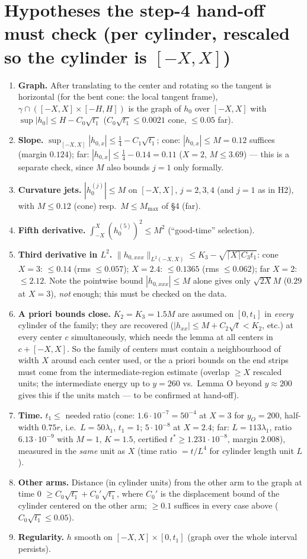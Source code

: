 \documentclass[11pt]{article}
\begin{document}
\section{Hypotheses the step-4 hand-off must check (per cylinder, rescaled so the cylinder is $[-X,X]$)}
\begin{enumerate}
\item[H1] \textbf{Graph.} After translating to the center and rotating so the tangent is horizontal (for the bent cone: the local tangent frame), $\gamma\cap([-X,X]\times[-H,H])$ is the graph of $h_0$ over $[-X,X]$ with $\sup|h_0|\le H-C_0\sqrt{t_1}$ ($C_0\sqrt{t_1}\le0.0021$ cone, $\le0.05$ far).
\item[H2] \textbf{Slope.} $\sup_{[-X,X]}|h_{0,x}|\le\frac14-C_1\sqrt{t_1}$; cone: $|h_{0,x}|\le M=0.12$ suffices (margin $0.124$); far: $|h_{0,x}|\le\frac14-0.14=0.11$ ($X=2$, $M\le3.69$) --- this is a separate check, since $M$ also bounds $j=1$ only formally.
\item[H3] \textbf{Curvature jets.} $|h_0^{(j)}|\le M$ on $[-X,X]$, $j=2,3,4$ (and $j=1$ as in H2), with $M\le0.12$ (cone) resp.\ $M\le M_{\max}$ of \S4 (far).
\item[H4] \textbf{Fifth derivative.} $\int_{-X}^X(h_0^{(5)})^2\le M^2$ (``good-time'' selection).
\item[H5] \textbf{Third derivative in $L^2$.} $\|h_{0,xxx}\|_{L^2(-X,X)}\le K_3-\sqrt{\lceil X\rceil C_3t_1}$: cone $X=3$: $\le0.14$ (rms $\le0.057$); $X=2.4$: $\le0.1365$ (rms $\le0.062$); far $X=2$: $\le2.12$. Note the pointwise bound $|h_{0,xxx}|\le M$ alone gives only $\sqrt{2X}M$ ($0.29$ at $X=3$), \emph{not} enough; this must be checked on the data.
\item[H6] \textbf{A priori bounds close.} $K_2=K_3=1.5M$ are assumed on $[0,t_1]$ in \emph{every} cylinder of the family; they are recovered ($|h_{xx}|\le M+C_2\sqrt t<K_2$, etc.) at every center $c$ simultaneously, which needs the lemma at all centers in $c+[-X,X]$. So the family of centers must contain a neighbourhood of width $X$ around each center used, or the a priori bounds on the end strips must come from the intermediate-region estimate (overlap $\ge X$ rescaled units; the intermediate energy up to $y=260$ vs.\ Lemma O beyond $y\approx200$ gives this if the units match --- to be confirmed at hand-off).
\item[H7] \textbf{Time.} $t_1\le$ needed ratio (cone: $1.6\cdot10^{-7}=50^{-4}$ at $X=3$ for $y_O=200$, half-width $0.75r$, i.e.\ $L=50\lambda_1$, $t_1=1$; $5\cdot10^{-8}$ at $X=2.4$; far: $L=113\lambda_1$, ratio $6.13\cdot10^{-9}$ with $M=1$, $K=1.5$, certified $t^*\ge1.231\cdot10^{-8}$, margin $2.008$), measured in the \emph{same} unit as $X$ (time ratio $=t/L^4$ for cylinder length unit $L$).
\item[H8] \textbf{Other arms.} Distance (in cylinder units) from the other arm to the graph at time $0$ $\ge C_0\sqrt{t_1}+C_0'\sqrt{t_1}$, where $C_0'$ is the displacement bound of the cylinder centered on the other arm; $\ge0.1$ suffices in every case above ($C_0\sqrt{t_1}\le0.05$).
\item[H9] \textbf{Regularity.} $h$ smooth on $[-X,X]\times[0,t_1]$ (graph over the whole interval persists).
\end{enumerate}
\end{document}
